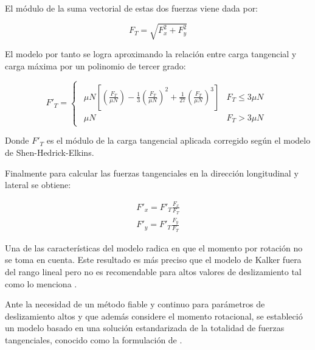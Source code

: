 \documentclass[main]{subfiles}
\begin{document}
El módulo de la suma vectorial de estas dos fuerzas viene dada por:

\begin{equation}
F_T=\sqrt{F_x^2+F_y^2}
\end{equation}

El modelo por tanto se logra aproximando la relación entre carga tangencial y carga máxima por un polinomio de tercer grado:

\begin{equation}
F'_T=
\begin{cases} 
\begin{matrix} \mu N 
\left[ 
\left(
\frac{F_T}{\mu N}
\right)
-\frac{1}{3}
\left(
\frac{F_T}{\mu N}
\right)^2 
+\frac{1}{27}
\left(
\frac{F_T}{\mu N}
\right)^3 
\right]
 & F_T\le 3\mu N \\\mu N & F_T> 3\mu N 
\end{matrix} 
\end{cases}
\end{equation}

\par \hspace{2cm}
\begin{minipage}{8cm}
\begin{spacing}{0.5}
Donde $F'_T$ es el módulo de la carga tangencial aplicada corregido según el modelo de Shen-Hedrick-Elkins.
\end{spacing}
\end{minipage}

Finalmente para calcular las fuerzas tangenciales en la dirección longitudinal y lateral se obtiene:

\begin{eqnarray}
F'_x=F'_T\frac{F_x}{F_T}\\
F'_y=F'_T\frac{F_y}{F_T}
\end{eqnarray}

Una de las características del modelo radica en que el momento por rotación no se toma en cuenta. Este resultado es más preciso que el modelo de Kalker fuera del rango lineal pero no es recomendable para altos valores de deslizamiento tal como lo menciona \citet{springerlink:10.1007/s11044-007-9094-y}.

Ante la necesidad de un método fiable y continuo para parámetros de deslizamiento altos y que además considere el momento rotacional, se estableció un modelo basado en una solución estandarizada de la totalidad de fuerzas tangenciales, conocido como la formulación de \citet{Polach1999}.
\end{document}
